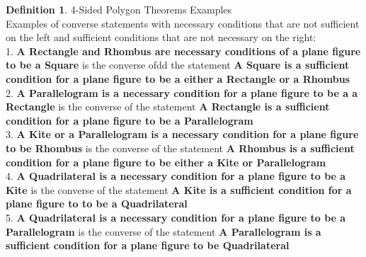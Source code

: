 \documentclass{book}
\theoremstyle{definition}
\newtheorem{definition}{Definition}[section]
\theoremstyle{remark}
\begin{document}
\newpage
\begin{definition}
4-Sided Polygon Theorems Examples \\

Examples of converse statements with necessary conditions that are not sufficient on the left and sufficient conditions that are not necessary on the right: \\

1. {\bf A Rectangle and Rhombus are necessary conditions of a plane figure to be a Square} is the converse ofdd the statement {\bf A Square is a sufficient condition for a plane figure to be a either a Rectangle or a Rhombus} \\


2. {\bf A Parallelogram is a necessary condition for a plane figure to be a a Rectangle} is the converse of the statement {\bf A Rectangle is a sufficient condition for a plane figure to be a Parallelogram}\\

3. {\bf A Kite or a Parallelogram is a necessary condition for a plane figure to be Rhombus} is the converse of the statement {\bf A Rhombus is a sufficient condition for a plane figure to be either a Kite or Parallelogram}\\

4. {\bf A Quadrilateral is a necessary condition for a plane figure to be a Kite} is the converse of the statement {\bf A Kite is a sufficient condition for a plane figure to to be a Quadrilateral} \\

5. {\bf A Quadrilateral is a necessary condition for a plane figure to be a Parallelogram} is the converse of the statement {\bf A Parallelogram is a sufficient condition for a plane figure to be Quadrilateral} \\
\end{definition}
\end{document}
